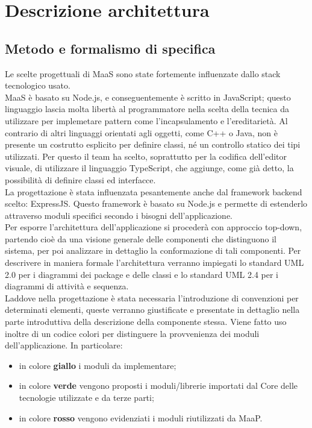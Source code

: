 \newpage
\section{Descrizione architettura}
\subsection{Metodo e formalismo di specifica}
Le scelte progettuali di MaaS sono state fortemente influenzate dallo stack tecnologico usato. \\
MaaS è basato su Node.js, e conseguentemente è scritto in JavaScript; questo linguaggio lascia molta libertà al programmatore nella scelta della tecnica da utilizzare per implemetare pattern come l'incapsulamento e l'ereditarietà. Al contrario di altri linguaggi orientati agli oggetti, come C++ o Java, non è presente un costrutto esplicito per definire classi, né un controllo statico dei tipi utilizzati. Per questo il team ha scelto, soprattutto per la codifica dell'editor visuale, di utilizzare il linguaggio TypeScript, che aggiunge, come già detto, la possibilità di definire classi ed interfacce. \\
La progettazione è stata influenzata pesantemente anche dal framework backend scelto: ExpressJS. Questo framework è basato su Node.js e permette di estenderlo attraverso moduli specifici secondo i bisogni dell'applicazione. \\
Per esporre l'architettura dell'applicazione si procederà con approccio top-down, partendo cioè da una visione generale delle componenti che distinguono il sistema, per poi analizzare in dettaglio la conformazione di tali componenti. Per descrivere in maniera formale l'architettura verranno impiegati lo standard UML 2.0 per i diagrammi dei package e delle classi e lo standard UML 2.4 per i diagrammi di attività e sequenza. \\
Laddove nella progettazione è stata necessaria l'introduzione di convenzioni per determinati elementi, queste verranno giustificate e presentate in dettaglio nella parte introduttiva della descrizione della componente stessa.
Viene fatto uso inoltre di un codice colori per distinguere la provvenienza dei moduli dell'applicazione. In particolare:
\begin{itemize}
\item in colore \textbf{giallo} i moduli da implementare;
\item in colore \textbf{verde} vengono proposti i moduli/librerie importati dal Core delle tecnologie utilizzate e da terze parti;
\item in colore \textbf{rosso} vengono evidenziati i moduli riutilizzati da MaaP.
\end{itemize}

